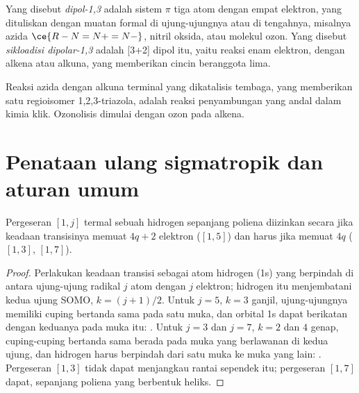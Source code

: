 \begin{definition}\label{def:b3:pericyclic:dipolar}
Yang disebut \emph{dipol-1,3} adalah sistem $\pi$ tiga atom dengan empat
elektron, yang dituliskan dengan muatan formal di ujung-ujungnya atau di tengahnya, misalnya
azida $\ce{R-N=N+=N-}$, nitril oksida, atau molekul ozon. Yang disebut \emph{sikloadisi
dipolar-1,3} adalah  [3+2] dipol itu, yaitu
reaksi enam elektron, dengan alkena atau alkuna, yang memberikan cincin beranggota lima.
\end{definition}

Reaksi azida dengan alkuna terminal yang dikatalisis tembaga, yang memberikan satu
regioisomer 1,2,3-triazola, adalah reaksi penyambungan yang andal dalam kimia
klik. Ozonolisis dimulai dengan  ozon pada
alkena.

\section{Penataan ulang sigmatropik dan aturan umum}

\begin{proposition}\label{prop:b3:pericyclic:sigmatropic-h}
Pergeseran $[1, j]$ termal sebuah hidrogen sepanjang poliena diizinkan secara  jika
keadaan transisinya memuat $4q + 2$ elektron ($[1,5]$) dan harus  jika memuat $4q$
($[1,3]$, $[1,7]$).
\end{proposition}

\begin{proof}
Perlakukan keadaan transisi sebagai atom hidrogen (1s) yang berpindah di antara ujung-ujung
radikal $j$ atom dengan $j$ elektron; hidrogen itu menjembatani kedua ujung
SOMO, $k = (j + 1)/2$. Untuk $j = 5$, $k = 3$ ganjil, ujung-ujungnya memiliki cuping bertanda sama pada satu muka,
dan orbital 1s dapat berikatan dengan keduanya pada muka itu: . Untuk $j = 3$ dan $j = 7$,
$k = 2$ dan $4$ genap, cuping-cuping bertanda sama berada pada muka yang berlawanan di kedua ujung, dan
hidrogen harus berpindah dari satu muka ke muka yang lain: . Pergeseran $[1,3]$
tidak dapat menjangkau rantai sependek itu; pergeseran $[1,7]$ dapat, sepanjang poliena yang berbentuk heliks.
\end{proof}


